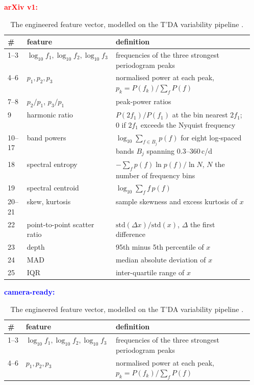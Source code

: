 \documentclass{article}
\providecommand{\DIFaddbeginFL}{} %
\providecommand{\DIFdelbeginFL}{} %
\providecommand{\DIFdelendFL}{} %
\providecommand{\DIFscaledelfig}{0.5}
\newlength{\DIFdelgraphicswidth} %
\newlength{\DIFdelgraphicsheight} %
\providecommand{\DIFaddincludegraphics}[2][]{{\color{blue}\fbox{\DIFOincludegraphics[#1]{#2}}}} %
\providecommand{\DIFdelincludegraphics}[2][]{%
\sbox{\DIFdelgraphicsbox}{\DIFOincludegraphics[#1]{#2}}%
\settoboxwidth{\DIFdelgraphicswidth}{\DIFdelgraphicsbox} %
\settoboxtotalheight{\DIFdelgraphicsheight}{\DIFdelgraphicsbox} %
\scalebox{\DIFscaledelfig}{%
\parbox[b]{\DIFdelgraphicswidth}{\usebox{\DIFdelgraphicsbox}\\[-\baselineskip] \rule{\DIFdelgraphicswidth}{0em}}\llap{\resizebox{\DIFdelgraphicswidth}{\DIFdelgraphicsheight}{%
\setlength{\unitlength}{\DIFdelgraphicswidth}%
\begin{picture}(1,1)%
\thicklines\linethickness{2pt} %
{\color[rgb]{1,0,0}\put(0,0){\framebox(1,1){}}}%
{\color[rgb]{1,0,0}\put(0,0){\line( 1,1){1}}}%
{\color[rgb]{1,0,0}\put(0,1){\line(1,-1){1}}}%
\end{picture}%
}\hspace*{3pt}}} %
} %
\DeclareRobustCommand{\DIFaddbeginFL}{\DIFOaddbeginFL \let\includegraphics\DIFaddincludegraphics} %
\DeclareRobustCommand{\DIFdelbeginFL}{\DIFOdelbeginFL \let\includegraphics\DIFdelincludegraphics} %
\DeclareRobustCommand{\DIFdelendFL}{\DIFOaddendFL \let\includegraphics\DIFOincludegraphics} %
\begin{document}
\begin{table}[H]
\caption{The engineered feature vector, modelled on the T'DA variability pipeline \citep{audenaert2021}.}
\label{tab:features}
\centering
\small
\DIFdelbeginFL
{\scriptsize\textcolor{red}{\textbf{arXiv v1:}}}\par\nobreak\smallskip
\begingroup\color{red}
\begin{tabular}{llp{0.56\linewidth}}
\toprule
\# & feature & definition \\
\midrule
1--3 & $\log_{10} f_{1}, \log_{10} f_{2}, \log_{10} f_{3}$ & frequencies of the three strongest periodogram peaks \\
4--6 & $p_{1}, p_{2}, p_{3}$ & normalised power at each peak, $p_{k} = P(f_{k})/\sum_f P(f)$ \\
7--8 & $p_{2}/p_{1}$, $p_{3}/p_{1}$ & peak-power ratios \\
9 & harmonic ratio & $P(2f_{1})/P(f_{1})$ at the bin nearest $2f_{1}$; $0$ if $2f_{1}$ exceeds the Nyquist frequency \\
10--17 & band powers & $\log_{10} \sum_{f \in B_{j}} p(f)$ for eight log-spaced bands $B_{j}$ spanning 0.3--360\,c/d \\
18 & spectral entropy & $-\sum_f p(f)\ln p(f) / \ln N$, $N$ the number of frequency bins \\
19 & spectral centroid & $\log_{10} \sum_f f\,p(f)$ \\
20--21 & skew, kurtosis & sample skewness and excess kurtosis of $x$ \\
22 & point-to-point scatter ratio & $\mathrm{std}(\Delta x)/\mathrm{std}(x)$, $\Delta$ the first difference \\
23 & depth & 95th minus 5th percentile of $x$ \\
24 & MAD & median absolute deviation of $x$ \\
25 & IQR & inter-quartile range of $x$ \\
\bottomrule
\end{tabular}
\endgroup\par\medskip
{\scriptsize\textcolor{blue}{\textbf{camera-ready:}}}\par\nobreak\smallskip
\DIFdelendFL \DIFaddbeginFL \begin{tabular}{llp{0.56\linewidth}}
\toprule
\# & feature & definition \\
\midrule
1--3 & $\log_{10} f_{1}, \log_{10} f_{2}, \log_{10} f_{3}$ & frequencies of the three strongest periodogram peaks \\
4--6 & $p_{1}, p_{2}, p_{3}$ & normalised power at each peak, $p_{k} = P(f_{k})/\sum_f P(f)$ \\

\end{tabular}
\end{table}
\end{document}
